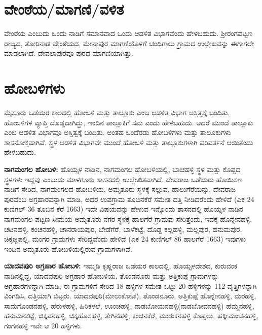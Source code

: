 \section{ವೇಂಠೆಯ/ಮಾಗಣಿ/ವಳಿತ}

ವೇಂಠೆಯ ಎಂಬುದು ಒಂದು ನಾಡಿಗೆ ಸಮಾನವಾದ ಒಂದು ಆಡಳಿತ ವಿಭಾಗವೆಂದು ಹೇಳಬಹುದು. ಶ‍್ರೀರಂಗಪಟ್ಟಣ ರಾಜ್ಯದ, ತೋರಿನಾಡ ವೇಂಠೆಯದ, ಮೇನಾಪುರ ಮಾಗಣಿಯೊಳಗೆ ಚಂದಿಗಾಲು ಗ್ರಾಮದ ಉಲ್ಲೇಖವನ್ನು ಈಗಾಗಲೇ ಮಾಡಲಾಗಿದೆ. ದೇವಲಾಪುರವೂ ಪುರದ ಮಾಗಣಿಯಾಗಿತ್ತು.


\section{ಹೋಬಳಿಗಳು}

ಮೈಸೂರು ಒಡೆಯರ ಕಾಲದಲ್ಲಿ ಹೋಬಳಿ ಮತ್ತು ತಾಲ್ಲೂಕು ಎಂಬ ಆಡಳಿತ ವಿಭಾಗ ಅಸ್ತಿತ್ವಕ್ಕೆ ಬಂದಿತು. ಹೋಬಳಿಗಳ ವ್ಯಾಪ್ತಿ ದೊಡ್ಡದಾಗಿದ್ದು, ಇಂದಿನ ತಾಲ್ಲೂಕಿಗೆ ಸಮ ಎಂದು ಹೇಳಬಹುದು. ಆದರೆ ಮುಂದೆ ತಾಲ್ಲೂಕು ಎಂಬ ಆಡಳಿತ ವಿಭಾಗವೂ ಅಸ್ತಿತ್ವಕ್ಕೆ ಬಂದಿತು. ಅಂತಹ ಒಂದೆರಡು ಹೋಬಳಿಗಳು ಮತ್ತು ತಾಲೂಕುಗಳು ಶಾಸನೋಕ್ತವಾಗಿವೆ. ಸ್ಥಳ ಆಡಳಿತ ವಿಭಾಗವೇ ಮುಂದೆ ಹೋಬಳಿ ಮತ್ತು ತಾಲ್ಲೂಕುಗಳಾಗಿ ಪರಿವರ್ತನೆ ಆಯಿತೆಂದು ಹೇಳಬಹುದು.

\textbf{ನಾಗಮಂಗಲ ಹೋಬಳಿ:} ಹೊಯ್ಸಳ ನಾಡಿನ, ನಾಗಮಂಗಲ ಹೋಬಳಿಯಲ್ಲಿ, ಬಾಚಹಳ್ಳಿ ಸ್ಥಳ ಮತ್ತು ಕೊಪ್ಪದ ಸ್ಥಳಗಳು ಇದ್ದವು ಎಂಬುದು ಮಾಳಗೂರು ಶಾಸನದಲ್ಲಿ ಉಲ್ಲೇಖಿತವಾಗಿದೆ. ದೇವರಾಜ ಒಡೆಯರು ಹೊಯಿಸಣ ನಾಡಿಗೆ ಸೇರಿದ, ನಾಗಮಂಗಲದ ಹೋಬಳಿಯ, ಅಮೃತೂರು ಸ್ಥಳಕ್ಕೆ ಸಲ್ಲುವ, ಹಾಲುಗೆರೆಯನ್ನು, ದೇವರಾಜ ಪುರವೆಂಬ ಅಗ್ರಹಾರವನ್ನಾಗಿ ಮಾಡಿ, ಅದರ ಉಪಗ್ರಾಮ ತೂಬಿನಕೆರೆ ಸಮೇತ ದತ್ತಿ ನೀಡಿದರೆಂದು ಹೇಳಿದೆ (ಎಕ 24 ಕುಣಿಗಲ್ 36 ತೂಬಿನ ಕೆರೆ 1663) ಇದೇ ವಿಷಯವನ್ನು ಹೇಳುವ ಇನ್ನೊಂದು ಶಾಸನದಲ್ಲಿ ಹೊಯ್ಸಳ ನಾಡಿನ ನಾಗಮಂಗಲ ಪಟ್ಟಣ ಸೀಮೆಯ ಅಮೃತೂರು ನಗರ ಸ್ಥಳಕ್ಕೆ ಹಾಲಗೆರೆ ಗ್ರಾಮವು ಸೇರಿತ್ತೆಂದು, ಇದಕ್ಕೆ ಹೊನ್ನೇನಹಳ್ಳಿ, ಚಟನಹಳ್ಳಿ, ಕಂಚನಹಳ್ಳಿ, ಚಾನರಾಯಪುರ, ಬೇಡೆಗೆರೆ, ಬಾಳೆಕಟ್ಟೆ, ದೊಡ್ದ ಕಲ್ಲಹಳ್ಳಿ, ಮಲ್ಲಪುರ, ಹನುಮಪುರ, ಚಿಕ್ಕಜ್ಜಪಲ್ಲಿ, ಮಂಗರ ಗ್ರಾಮಗಳು ಸೇರಿದ್ದವೆಂದು ಹೇಳಿದೆ (ಎಕ 24 ಕುಣಿಗಲ್ 86 ಹಾಲಗೆರೆ 1663) ಇವುಗಳು ಇಂದಿನ ಅಮೃತೂರು ಹೋಬಳಿಯಲ್ಲಿರುವ ಗ್ರಾಮಗಳಾಗಿವೆ.


\textbf{ಯಾದವಪುರಿ ಅಗ್ರಹಾರ ಹೋಬಳಿ:} ಇಮ್ಮಡಿ ಕೃಷ್ಣರಾಜ ಒಡೆಯರ ಕಾಲದಲ್ಲಿ, ಹೊಯ್ಸಳದೇಶದ, ಕುರುವಂಕ ನಾಡಿನಲ್ಲಿದ್ದ, ಯಾದವಪುರಿ ಅಗ್ರಹಾರ ಹೋಬಳಿಯ, ತೊಂಡನೂರು ಮತ್ತು ಅತ್ತಿಕುಪ್ಪೆ ಗ್ರಾಮಗಳನ್ನು ಅಗ್ರಹಾರಗಳನ್ನಾಗಿ ಮಾಡಿ, ಈ ಗ್ರಾಮಗಳಿಗೆ ಸೇರಿದ 18 ಹಳ್ಳಿಗಳ ಸಮೇತ ಒಟ್ಟು 20 ಹಳ್ಳಿಗಳನ್ನು 112 ವೃತ್ತಿಗಳನ್ನಾಗಿ ವಿಂಗಡಿಸಿ, ದತ್ತಿಯಾಗಿ ಬಿಟ್ಟರು. ಯಾದವಪುರಿ(ಮೇಲುಕೋಟೆ), ತೊಂಡನೂರು, ಅತ್ತಿಕುಪ್ಪೆ ಹೊನ್ನೇನಹಳ್ಳಿ, ಮರಹಳ್ಳಿ, ಸಾದುಗೊಂಡನಹಳ್ಳಿ, ಹೆರುಳಹಳ್ಳಿ, ಹಿರಿಕಳಲೆ, ಊಂಚಹಳ್ಳಿ, ನಾಡಬೋಯನಹಳ್ಳಿ(ನಾಡಬೋವನಹಳ್ಳಿ) ಹೆಮ್ಮನಹಳ್ಳಿ, ಹನುಮನಕಟ್ಟೆ, ಚಿಕ್ಕವನಹಳ್ಳಿ, ಚಿಕ್ಕಹೊಸಹಳ್ಳಿ, ತೇಗಿನಹಳ್ಳಿ, ಕಂಚಿನಕೆರೆ, ಮುರುಕನಹಳ್ಳಿ ಕೊಪ್ಪಲು, ಹಕ್ಕೀಮಂಚನಹಳ್ಳಿ, ಗಂಗನಹಳ್ಳಿ ಇವೇ ಆ 20 ಹಳ್ಳಿಗಳು.

